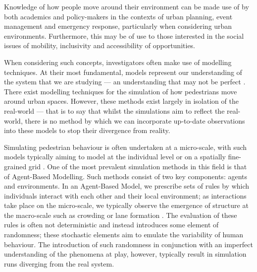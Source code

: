 \documentclass[12pt, twoside, a4paper]{article}
\begin{document}

Knowledge of how people move around their environment can be made use of by both
academics and policy-makers in the contexts of urban planning, event management
and emergency response, particularly when considering urban environments.
Furthermore, this may be of use to those interested in the social issues of
mobility, inclusivity and accessibility of opportunities.

When considering such concepts, investigators often make use of modelling
techniques.
At their most fundamental, models represent our understanding of the system that
we are studying --- an understanding that may not be perfect
\citep{stanislaw1986tests}.
There exist modelling techniques for the simulation of how pedestrians move
around urban spaces.
However, these methods exist largely in isolation of the real-world --- that is
to say that whilst the simulations aim to reflect the real-world, there is no
method by which we can incorporate up-to-date observations into these models to
stop their divergence from reality.

Simulating pedestrian behaviour is often undertaken at a micro-scale, with such
models typically aiming to model at the individual level or on a spatially
fine-grained grid \citep{burstedde2001simulation}.
One of the most prevalent simulation methods in this field is that of
Agent-Based Modelling.
Such methods consist of two key components: agents and environments.
In an Agent-Based Model, we prescribe sets of rules by which individuals
interact with each other and their local environment; as interactions take
place on the micro-scale, we typically observe the emergence of structure at the
macro-scale such as crowding \citep{batty2003discrete} or lane formation
\citep{liu2014agent}.
The evaluation of these rules is often not deterministic and instead introduces
some element of randomness; these stochastic elements aim to emulate the
variability of human behaviour.
The introduction of such randomness in conjunction with an imperfect
understanding of the phenomena at play, however, typically result in simulation
runs diverging from the real system.
\end{document}
